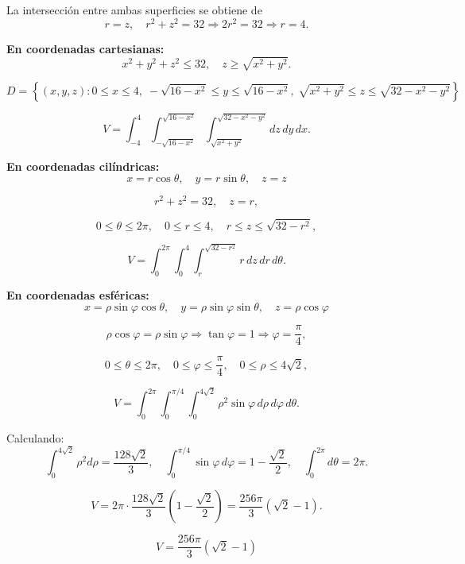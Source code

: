 La intersección entre  ambas superficies se obtiene de
\[
r=z, \quad r^2+z^2=32 \Rightarrow 2r^2=32 \Rightarrow r=4.
\]

\textbf{En coordenadas cartesianas:}
\[
x^2+y^2+z^2 \le 32, \quad z \ge \sqrt{x^2+y^2}.
\]

\[
D=\left\{(x,y,z):
0\le x\le 4,\;
-\sqrt{16-x^2}\le y\le \sqrt{16-x^2},\;
\sqrt{x^2+y^2}\le z\le \sqrt{32-x^2-y^2}
\right\}
\]

\[
V=\int_{-4}^{4}
\int_{-\sqrt{16-x^2}}^{\sqrt{16-x^2}}
\int_{\sqrt{x^2+y^2}}^{\sqrt{32-x^2-y^2}}
dz\,dy\,dx.
\]

\bigskip

\textbf{En coordenadas cilíndricas:}
\[
x = r\cos\theta, \quad y = r\sin\theta, \quad z = z
\]

\[
r^2+z^2=32, \quad z=r,
\]

\[
0\le\theta\le2\pi,\quad 0\le r\le4,\quad r\le z\le\sqrt{32-r^2},
\]

\[
V=\int_0^{2\pi}\int_0^4\int_r^{\sqrt{32-r^2}} r\,dz\,dr\,d\theta.
\]

\bigskip

\textbf{En coordenadas esféricas:}
\[
x=\rho\sin\varphi\cos\theta,\quad
y=\rho\sin\varphi\sin\theta,\quad
z=\rho\cos\varphi
\]

\[
\rho\cos\varphi=\rho\sin\varphi \Rightarrow \tan\varphi=1 \Rightarrow \varphi=\frac{\pi}{4},
\]

\[
0\le\theta\le2\pi,\quad 0\le\varphi\le\frac{\pi}{4},\quad 0\le\rho\le4\sqrt{2},
\]

\[
V=\int_0^{2\pi}\int_0^{\pi/4}\int_0^{4\sqrt{2}}\rho^2\sin\varphi\,d\rho\,d\varphi\,d\theta.
\]

\bigskip

Calculando:
\[
\int_0^{4\sqrt{2}}\rho^2 d\rho=\frac{128\sqrt{2}}{3}, \quad
\int_0^{\pi/4}\sin\varphi\,d\varphi=1-\frac{\sqrt{2}}{2}, \quad
\int_0^{2\pi}d\theta=2\pi.
\]

\[
V=2\pi\cdot\frac{128\sqrt{2}}{3}\left(1-\frac{\sqrt{2}}{2}\right)
=\frac{256\pi}{3}(\sqrt{2}-1).
\]

\[
\boxed{V=\frac{256\pi}{3}(\sqrt{2}-1)}
\]
